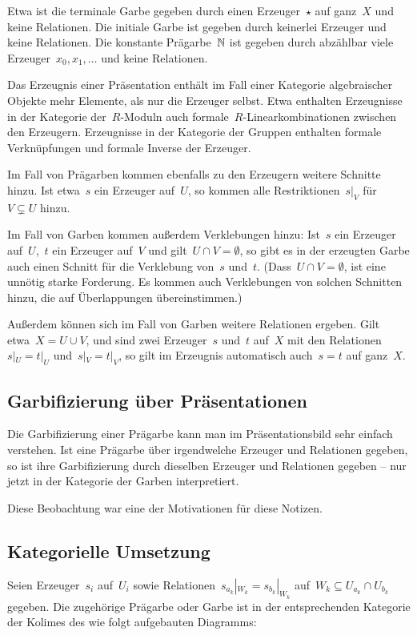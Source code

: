 \documentclass{uebblatt}
\begin{document}
Etwa ist die terminale Garbe gegeben durch einen Erzeuger~$\star$ auf ganz~$X$
und keine Relationen. Die initiale Garbe ist gegeben durch keinerlei Erzeuger
und keine Relationen. Die konstante Prägarbe~$\mathbb{N}$ ist gegeben durch abzählbar
viele Erzeuger~$x_0,x_1,\ldots$ und keine Relationen.

Das Erzeugnis einer Präsentation enthält im Fall einer Kategorie algebraischer
Objekte mehr Elemente, als nur die Erzeuger selbst. Etwa enthalten Erzeugnisse
in der Kategorie der~$R$-Moduln auch formale~$R$-Linearkombinationen zwischen
den Erzeugern. Erzeugnisse in der Kategorie der Gruppen enthalten formale
Verknüpfungen und formale Inverse der Erzeuger.

Im Fall von Prägarben kommen ebenfalls zu den Erzeugern weitere Schnitte hinzu.
Ist etwa~$s$ ein Erzeuger auf~$U$, so kommen alle Restriktionen~$s|_V$ für~$V
\subsetneq U$ hinzu.

Im Fall von Garben kommen außerdem Verklebungen hinzu: Ist~$s$ ein Erzeuger
auf~$U$,~$t$ ein Erzeuger auf~$V$ und gilt~$U \cap V = \emptyset$, so gibt es
in der erzeugten Garbe auch einen Schnitt für die Verklebung von~$s$ und~$t$.
(Dass~$U \cap V = \emptyset$, ist eine unnötig starke Forderung. Es kommen auch
Verklebungen von solchen Schnitten hinzu, die auf Überlappungen
übereinstimmen.)

Außerdem können sich im Fall von Garben weitere Relationen ergeben. Gilt
etwa~$X = U \cup V$, und sind zwei Erzeuger~$s$ und~$t$ auf~$X$ mit den
Relationen~$s|_U = t|_U$ und~$s|_V = t|_V$, so gilt im Erzeugnis automatisch
auch~$s = t$ auf ganz~$X$.


\subsection*{Garbifizierung über Präsentationen}

Die Garbifizierung einer Prägarbe kann man im Präsentationsbild sehr einfach
verstehen. Ist eine Prägarbe über irgendwelche Erzeuger und Relationen gegeben,
so ist ihre Garbifizierung durch dieselben Erzeuger und Relationen gegeben --
nur jetzt in der Kategorie der Garben interpretiert.

Diese Beobachtung war eine der Motivationen für diese Notizen.


\subsection*{Kategorielle Umsetzung}

Seien Erzeuger~$s_i$ auf~$U_i$ sowie Relationen~$s_{a_k}|_{W_k} =
s_{b_k}|_{W_k}$ auf~$W_k \subseteq U_{a_k} \cap U_{b_k}$ gegeben. Die
zugehörige Prägarbe oder Garbe ist in der entsprechenden Kategorie der Kolimes
des wie folgt aufgebauten Diagramms:
\end{document}
